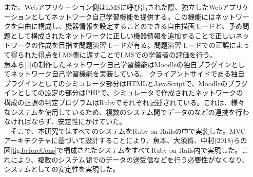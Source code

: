 また、Webアプリケーション側はLMSに呼び出された際、独立したWebアプリケーションとしてネットワーク自己学習機能を提供する。この機能にはネットワークを自由に構成し、機器情報を設定することのできる自由描画モードと、予め問題として構成されたネットワークに正しい機器情報を追加することで正しいネットワークの作成を目指す問題演習モードが有る。問題演習モードでの正誤によって得られた得点をLMS側に返すことでLMSでの学習者の評価を行う。\\
魚本ら[1]の制作したネットワーク自己学習機能はMoodleの独自プラグインとしてネットワーク自己学習機能を実装している。
クライアントサイドである独自プラグインとしてのシミュレータ部分はHTMLとJavaScriptで、Moodleのプラグインとしての設定の部分はPHPで、シミュレータで作成されたネットワークの構成の正誤の判定プログラムはRubyでそれぞれ記述されている。これは、様々なシステムを使用しているため、複数のシステム間でデータのなどの連携を行わなければならず、安定性にかけていた。\\
　そこで、本研究ではすべてのシステムをRuby on Railsの中で実装した。MVCアーキテクチャに基づいて設計することにより、魚本、大須賀、中村(2018)らの図\ref{fig:beforeCons}で構成されたシステムをすべてRuby on Rails内で実現した。これにより、複数のシステム間でのデータの送受信などを行う必要性がなくなり、システムとしての安定性を実現した。
